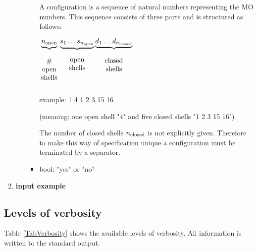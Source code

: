 \begin{enumerate}
\begin{enumerate}
\begin{itemize}
A configuration is a sequence of natural numbers representing the
MO numbers. This sequence consists
of three parts and is structured as follows:

$\underbrace{n_{\rm open}}_{
\parbox{1cm}{\begin{center}\# open shells \end{center}}}
\underbrace{s_1 \ldots s_{n_{\rm open}}}_{
\parbox{1cm}{\begin{center} open shells \end{center}}}
\underbrace{d_1 \ldots d_{n_{\rm closed}}}_{
\parbox{1cm}{\begin{center} closed shells \end{center}}}$

example: 1 4 1 2 3 15 16 

(meaning: one open shell "4" and five closed shells "1 2 3 15 16")

The number of closed shells $n_{\rm closed}$ is not explicitly given. Therefore
to make this way of specification unique
a configuration must be terminated by a separator.

\item bool: "yes" or "no"

\end{itemize}


\end{enumerate}
\item {\bf input example}

\end{enumerate}


\subsection{Levels of verbosity}
Table \ref{TabVerbosity} shows the available
levels of verbosity. All information is written to the standard output.

\def\yes{$\bullet$}
\def\no{--}


